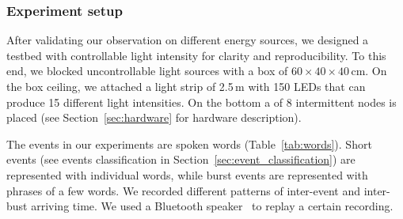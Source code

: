 \subsubsection{Experiment setup}
\label{sec:experiment_setup}
%
After validating our observation on different energy sources, we designed a testbed with controllable light intensity for clarity and reproducibility. To this end, we blocked uncontrollable light sources with a box of $60 \times 40 \times 40$\,cm. On the box ceiling, we attached a light strip of 2.5\,m with 150 LEDs that can produce 15 different light intensities. On the bottom a \fullCIM of 8 intermittent nodes is placed (see Section~\ref{sec:hardware} for hardware description).

The events in our experiments are spoken words (Table~\ref{tab:words}). 
Short events (see events classification in Section~\ref{sec:event_classification}) are represented with individual words, while burst events are represented with phrases of a few words.
We recorded different patterns of inter-event and inter-bust arriving time. We used a Bluetooth speaker~\cite{jbl} to replay a certain recording. 
%
